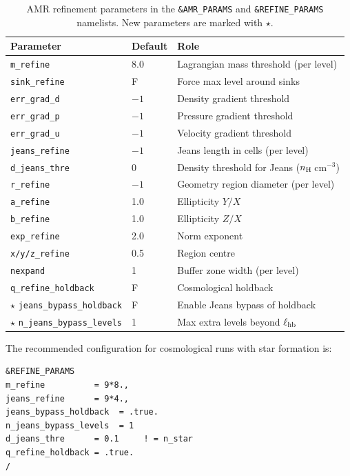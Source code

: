 \documentclass[fleqn,usenatbib]{mnras}
\newcommand{\code}[1]{\texttt{#1}}
\begin{document}
\begin{table}
\centering
\caption{AMR refinement parameters in the \code{\&AMR\_PARAMS} and
\code{\&REFINE\_PARAMS} namelists.  New parameters are marked with
$\star$.}
\label{tab:refine_params}
\begin{tabular}{lll}
\toprule
Parameter & Default & Role \\
\midrule
\code{m\_refine}      & 8.0  & Lagrangian mass threshold (per level) \\
\code{sink\_refine}   & F    & Force max level around sinks \\
\code{err\_grad\_d}   & $-1$ & Density gradient threshold \\
\code{err\_grad\_p}   & $-1$ & Pressure gradient threshold \\
\code{err\_grad\_u}   & $-1$ & Velocity gradient threshold \\
\code{jeans\_refine}  & $-1$ & Jeans length in cells (per level) \\
\code{d\_jeans\_thre} & 0    & Density threshold for Jeans
  ($n_{\rm H}\,$cm$^{-3}$) \\
\code{r\_refine}      & $-1$ & Geometry region diameter (per level) \\
\code{a\_refine}      & 1.0  & Ellipticity $Y/X$ \\
\code{b\_refine}      & 1.0  & Ellipticity $Z/X$ \\
\code{exp\_refine}    & 2.0  & Norm exponent \\
\code{x/y/z\_refine}  & 0.5  & Region centre \\
\code{nexpand}        & 1    & Buffer zone width (per level) \\
\code{q\_refine\_holdback} & F & Cosmological holdback \\
$\star$ \code{jeans\_bypass\_holdback} & F &
  Enable Jeans bypass of holdback \\
$\star$ \code{n\_jeans\_bypass\_levels} & 1 &
  Max extra levels beyond $\ell_{\rm hb}$ \\
\bottomrule
\end{tabular}
\end{table}

The recommended configuration for cosmological runs with star
formation is:
\begin{lstlisting}
&REFINE_PARAMS
m_refine          = 9*8.,
jeans_refine      = 9*4.,
jeans_bypass_holdback  = .true.
n_jeans_bypass_levels  = 1
d_jeans_thre      = 0.1     ! = n_star
q_refine_holdback = .true.
/
\end{lstlisting}
\end{document}

